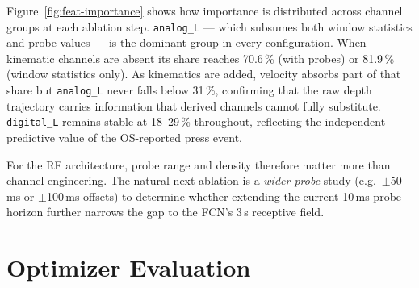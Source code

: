 

Figure~\ref{fig:feat-importance} shows how importance is distributed across channel
groups at each ablation step.  \texttt{analog\_L} --- which subsumes both window
statistics and probe values --- is the dominant group in every configuration.  When
kinematic channels are absent its share reaches 70.6\,\% (with probes) or 81.9\,\%
(window statistics only).  As kinematics are added, velocity absorbs part of that
share but \texttt{analog\_L} never falls below 31\,\%, confirming that the raw
depth trajectory carries information that derived channels cannot fully substitute.
\texttt{digital\_L} remains stable at 18--29\,\% throughout, reflecting the
independent predictive value of the OS-reported press event.

For the RF architecture, probe range and density therefore matter more than channel
engineering.  The natural next ablation is a \emph{wider-probe} study (e.g.\
$\pm$50\,ms or $\pm$100\,ms offsets) to determine whether extending the current
10\,ms probe horizon further narrows the gap to the FCN's 3\,s receptive field.

\FloatBarrier
\section{Optimizer Evaluation}
\label{sec:eval-opt}

